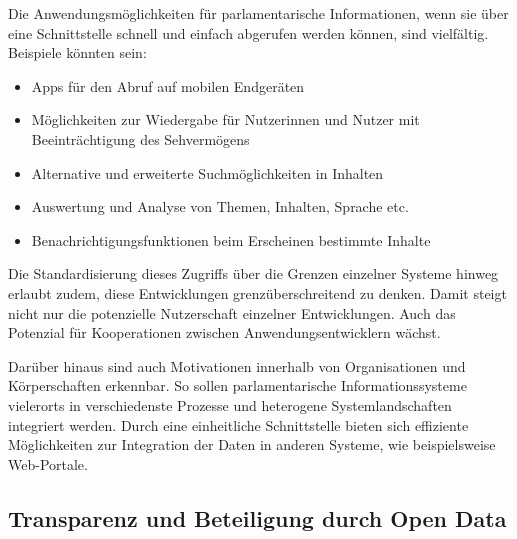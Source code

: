 \documentclass[,a4paper]{article}
\begin{document}
Die Anwendungsmöglichkeiten für parlamentarische Informationen, wenn sie
über eine Schnittstelle schnell und einfach abgerufen werden können,
sind vielfältig. Beispiele könnten sein:

\begin{itemize}
\itemsep1pt\parskip0pt
\item
  Apps für den Abruf auf mobilen Endgeräten
\item
  Möglichkeiten zur Wiedergabe für Nutzerinnen und Nutzer mit
  Beeinträchtigung des Sehvermögens
\item
  Alternative und erweiterte Suchmöglichkeiten in Inhalten
\item
  Auswertung und Analyse von Themen, Inhalten, Sprache etc.
\item
  Benachrichtigungsfunktionen beim Erscheinen bestimmte Inhalte
\end{itemize}

Die Standardisierung dieses Zugriffs über die Grenzen einzelner Systeme
hinweg erlaubt zudem, diese Entwicklungen grenzüberschreitend zu denken.
Damit steigt nicht nur die potenzielle Nutzerschaft einzelner
Entwicklungen. Auch das Potenzial für Kooperationen zwischen
Anwendungsentwicklern wächst.

Darüber hinaus sind auch Motivationen innerhalb von Organisationen und
Körperschaften erkennbar. So sollen parlamentarische Informationssysteme
vielerorts in verschiedenste Prozesse und heterogene Systemlandschaften
integriert werden. Durch eine einheitliche Schnittstelle bieten sich
effiziente Möglichkeiten zur Integration der Daten in anderen Systeme,
wie beispielsweise Web-Portale.

\subsection{Transparenz und Beteiligung durch Open
Data}\label{transparenz-und-beteiligung-durch-open-data}
\end{document}
